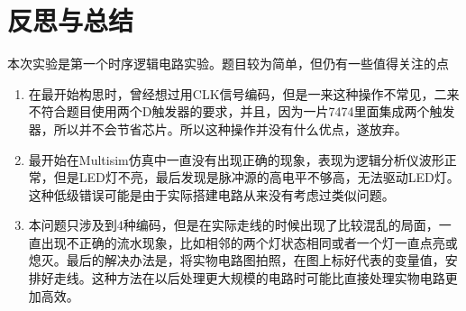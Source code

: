 \documentclass{ctexart}
\begin{document}
\section{反思与总结}
本次实验是第一个时序逻辑电路实验。题目较为简单，但仍有一些值得关注的点
\begin{enumerate}
    \item 在最开始构思时，曾经想过用CLK信号编码，但是一来这种操作不常见，二来不符合题目使用两个D触发器的要求，并且，因为一片7474里面集成两个触发器，所以并不会节省芯片。所以这种操作并没有什么优点，遂放弃。
    \item 最开始在Multisim仿真中一直没有出现正确的现象，表现为逻辑分析仪波形正常，但是LED灯不亮，最后发现是脉冲源的高电平不够高，无法驱动LED灯。这种低级错误可能是由于实际搭建电路从来没有考虑过类似问题。
    \item 本问题只涉及到4种编码，但是在实际走线的时候出现了比较混乱的局面，一直出现不正确的流水现象，比如相邻的两个灯状态相同或者一个灯一直点亮或熄灭。最后的解决办法是，将实物电路图拍照，在图上标好代表的变量值，安排好走线。这种方法在以后处理更大规模的电路时可能比直接处理实物电路更加高效。
\end{enumerate}
\end{document}

